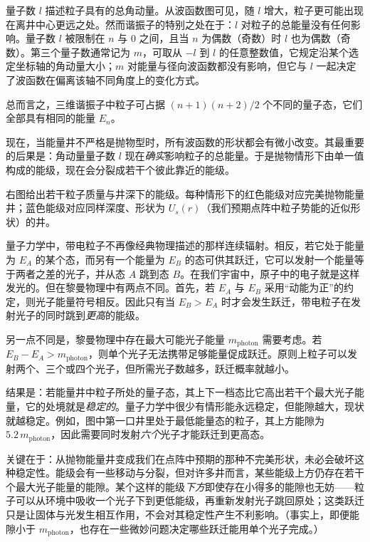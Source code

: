 量子数 $l$ 描述粒子具有的总角动量。从波函数图可见，随 $l$ 增大，粒子更可能出现在离井中心更远之处。然而谐振子的特别之处在于：$l$ 对粒子的总能量没有任何影响。量子数 $l$ 被限制在 $n$ 与 $0$ 之间，且当 $n$ 为偶数（奇数）时 $l$ 也为偶数（奇数）。第三个量子数通常记为 $m$，可取从 $-l$ 到 $l$ 的任意整数值，它规定沿某个选定坐标轴的角动量大小；$m$ 对能量与径向波函数都没有影响，但它与 $l$ 一起决定了波函数在偏离该轴不同角度上的变化方式。

总而言之，三维谐振子中粒子可占据 $(n+1)(n+2)/2$ 个不同的量子态，它们全部具有相同的能量 $E_{n}$。


现在，当能量井不严格是抛物型时，所有波函数的形状都会有微小改变。其最重要的后果是：角动量量子数 $l$ 现在\emph{确实}影响粒子的总能量。于是抛物情形下由单一值构成的能级，现在会分裂成若干个彼此靠近的能级。

右图给出若干粒子质量与井深下的能级。每种情形下的红色能级对应完美抛物能量井；蓝色能级对应同样深度、形状为 $U_{s}(r)$（我们预期点阵中粒子势能的近似形状）的井。

量子力学中，带电粒子不再像经典物理描述的那样连续辐射。相反，若它处于能量为 $E_{A}$ 的某个态，而另有一个能量为 $E_{B}$ 的态可供其跃迁，它可以发射一个能量等于两者之差的光子，并从态 $A$ 跳到态 $B$。在我们宇宙中，原子中的电子就是这样发光的。但在黎曼物理中有两点不同。首先，若 $E_{A}$ 与 $E_{B}$ 采用“动能为正”的约定，则光子能量符号相反。因此只有当 $E_{B}>E_{A}$ 时才会发生跃迁，带电粒子在发射光子的同时跳到\emph{更高}的能级。

另一点不同是，黎曼物理中存在最大可能光子能量 $m_{\mathrm{photon}}$ 需要考虑。若 $E_{B}-E_{A}>m_{\mathrm{photon}}$，则单个光子无法携带足够能量促成跃迁。原则上粒子可以发射两个、三个或四个光子，但所需光子数越多，跃迁概率就越小。

结果是：若能量井中粒子所处的量子态，其上下一档态比它高出若干个最大光子能量，它的处境就是\emph{稳定的}。量子力学中很少有情形能永远稳定，但能隙越大，现状就越稳定。例如，图中第一口井里处于最低能量态的粒子，其上方能隙为 $5.2\,m_{\mathrm{photon}}$，因此需要同时发射\emph{六个}光子才能跃迁到更高态。

关键在于：从抛物能量井变成我们在点阵中预期的那种不完美形状，未必会破坏这种稳定性。能级会有一些移动与分裂，但对许多井而言，某些能级上方仍存在若干个最大光子能量的能隙。某个这样的能级\emph{下方}即使存在小得多的能隙也无妨——粒子可以从环境中吸收一个光子下到更低能级，再重新发射光子跳回原处；这类跃迁只是让固体与光发生相互作用，不会对其稳定性产生不利影响。（事实上，即便能隙小于 $m_{\mathrm{photon}}$，也存在一些微妙问题决定哪些跃迁能用单个光子完成。）

